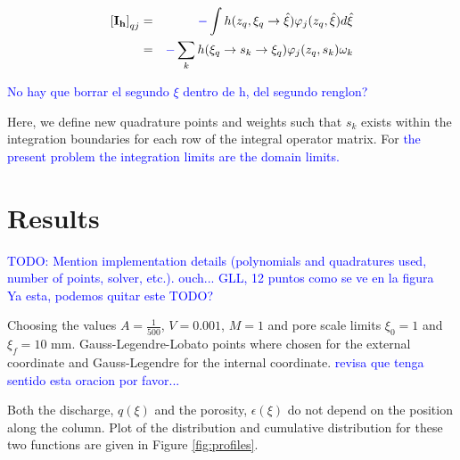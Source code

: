 \documentclass{CFD2011}
\newcommand{\TODO}[1]{\textcolor{blue}{TODO: #1} \\}
\newcommand{\Pablo}[1]{\textcolor{blue}{#1}}
\begin{document}
\begin{eqnarray}
\left[\mathbf{I_h}\right]_{qj}&=& \Pablo{-} \int h(z_q,\xi_q\rightarrow\hat{\xi})\varphi_j(z_q,\hat{\xi}) d\hat{\xi}\nonumber \\
&=& \Pablo{-} \sum_k h(\xi_q\rightarrow s_k \rightarrow\xi_q)\varphi_j(z_q,s_k) \omega_k
\end{eqnarray}

\Pablo{No hay que borrar el segundo $\xi$ dentro de h, del segundo renglon?}

Here, we define new quadrature points and weights such that $s_k$ exists within the integration boundaries for each row of the integral operator matrix. For \Pablo{the present problem the integration limits are the domain limits.}

\section{Results}


\TODO{Mention implementation details (polynomials and quadratures used, number of points, solver, etc.).  ouch... GLL, 12 puntos como se ve en la figura} \Pablo{Ya esta, podemos quitar este TODO?}

\noindent Choosing the values $A=\tfrac{1}{500}$, $V=0.001$, $M=1$ and pore scale limits $\xi_0=1$ and $\xi_f=10$ mm. Gauss-Legendre-Lobato points where chosen for the external coordinate and Gauss-Legendre for the internal coordinate. \Pablo{revisa que tenga sentido esta oracion por favor...}


Both the discharge, $q({\xi})$ and the porosity, $\epsilon({\xi})$ do not depend on the position along the column. Plot of the distribution and cumulative distribution for these two functions are given in Figure \ref{fig:profiles}.


\end{document}
